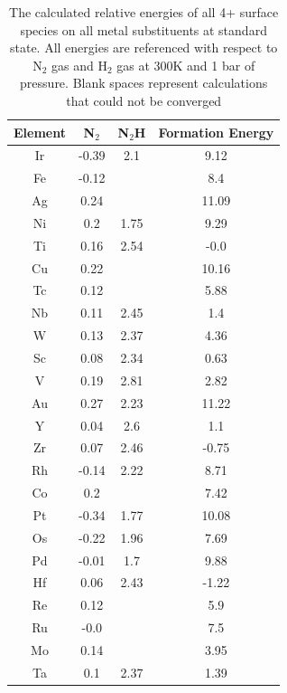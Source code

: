 \begin{table}
\begin{center}
\begin{tabular}{| c | c | c | c |}
\hline
Element & N$_2$ & N$_2$H & Formation Energy \\
\hline
Ir & -0.39 & 2.1 & 9.12 \\
Fe & -0.12 &  & 8.4 \\
Ag & 0.24 &  & 11.09 \\
Ni & 0.2 & 1.75 & 9.29 \\
Ti & 0.16 & 2.54 & -0.0 \\
Cu & 0.22 &  & 10.16 \\
Tc & 0.12 &  & 5.88 \\
Nb & 0.11 & 2.45 & 1.4 \\
W & 0.13 & 2.37 & 4.36 \\
Sc & 0.08 & 2.34 & 0.63 \\
V & 0.19 & 2.81 & 2.82 \\
Au & 0.27 & 2.23 & 11.22 \\
Y & 0.04 & 2.6 & 1.1 \\
Zr & 0.07 & 2.46 & -0.75 \\
Rh & -0.14 & 2.22 & 8.71 \\
Co & 0.2 &  & 7.42 \\
Pt & -0.34 & 1.77 & 10.08 \\
Os & -0.22 & 1.96 & 7.69 \\
Pd & -0.01 & 1.7 & 9.88 \\
Hf & 0.06 & 2.43 & -1.22 \\
Re & 0.12 &  & 5.9 \\
Ru & -0.0 &  & 7.5 \\
Mo & 0.14 &  & 3.95 \\
Ta & 0.1 & 2.37 & 1.39 \\
\hline
\end{tabular}
\end{center}
\label{table:4+_energies}
\caption{The calculated relative energies of all 4+ surface species on all metal substituents at standard state. All energies are referenced with respect to N$_2$ gas and H$_2$ gas at 300K and 1 bar of pressure. Blank spaces represent calculations that could not be converged}

\end{table}

